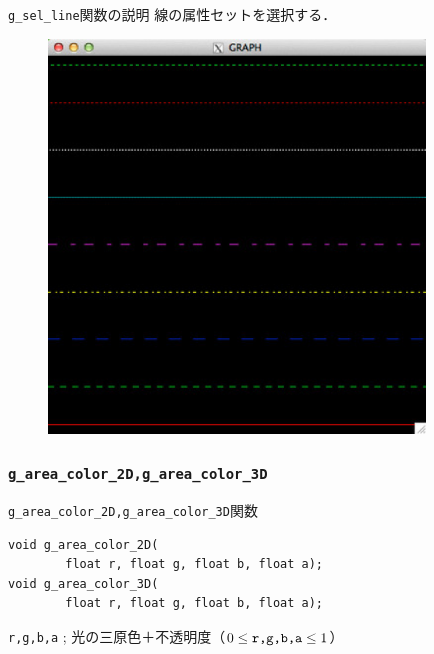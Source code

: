 \documentclass[a4paper,12pt]{jsarticle}%
\begin{document}
\begin{itembox}[l]{\texttt{g\_sel\_line}関数の説明}
線の属性セットを選択する．
\end{itembox}

\begin{figure}[htb]
	\includegraphics[width=100mm]{./Figures/eps/Canvas_g_line.eps}
\end{figure}





\clearpage
\subsubsection{\texttt{g\_area\_color\_2D,g\_area\_color\_3D}}

\begin{itembox}[l]{\texttt{g\_area\_color\_2D,g\_area\_color\_3D}関数}
\begin{verbatim}
void g_area_color_2D(
        float r, float g, float b, float a);
void g_area_color_3D(
        float r, float g, float b, float a);
\end{verbatim}
\verb|r,g,b,a| ; 光の三原色＋不透明度（$0\leq \verb|r,g,b,a| \leq 1$）\\
\end{itembox}
\end{document}

